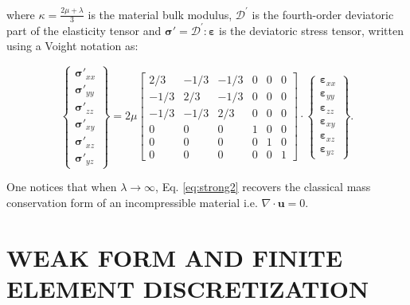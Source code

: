 \documentclass{wccm2024}
\begin{document}
\noindent where $\kappa=\frac{2\mu+\lambda}{3}$ is the material bulk modulus, $\mathcal{D}^{'}$ is the fourth-order deviatoric part of the elasticity tensor and $\boldsymbol{\sigma}'=\mathcal{D}^{'}:\boldsymbol{\varepsilon}$ is the deviatoric stress tensor, written using a Voight notation as:

\begin{equation}
    \begin{Bmatrix}
        \boldsymbol{\sigma}'_{xx}\\
        \boldsymbol{\sigma}'_{yy}\\
        \boldsymbol{\sigma}'_{zz}\\
        \boldsymbol{\sigma}'_{xy}\\
        \boldsymbol{\sigma}'_{xz}\\
        \boldsymbol{\sigma}'_{yz}
    \end{Bmatrix} = 2\mu\begin{bmatrix}
        2/3 & -1/3 & -1/3 & 0 & 0 & 0\\
        -1/3 & 2/3 & -1/3 & 0 & 0 & 0\\
        -1/3 & -1/3 & 2/3 & 0 & 0 & 0\\
        0 & 0 & 0 & 1 & 0 & 0\\
        0 & 0 & 0 & 0 & 1 & 0\\
        0 & 0 & 0 & 0 & 0 & 1
    \end{bmatrix} \cdot \begin{Bmatrix}
        \boldsymbol{\varepsilon}_{xx}\\
        \boldsymbol{\varepsilon}_{yy}\\
        \boldsymbol{\varepsilon}_{zz}\\
        \boldsymbol{\varepsilon}_{xy}\\
        \boldsymbol{\varepsilon}_{xz}\\
        \boldsymbol{\varepsilon}_{yz}
    \end{Bmatrix} \text{.}
\end{equation}

One notices that when $\lambda \rightarrow \infty$, Eq. \eqref{eq:strong2} recovers the classical mass conservation form of an incompressible material i.e. $\nabla \cdot \mathbf{u}=0$.

\section{WEAK FORM AND FINITE ELEMENT DISCRETIZATION}
\end{document}
